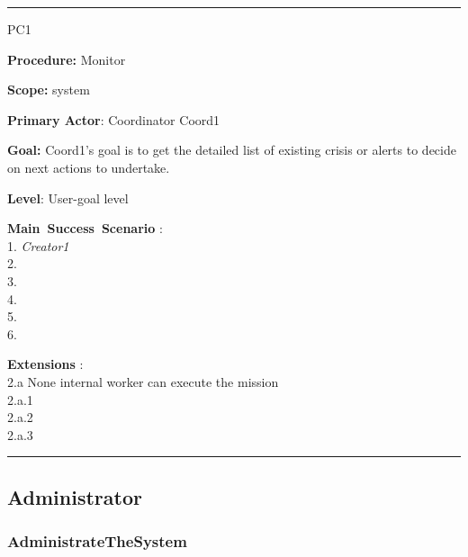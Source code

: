 \hrule
\begin{lyxlist}{PC1}
\small{
\item [\textbf{Procedure:}] Monitor
\item [\textbf{Scope:}] system
\item [\textbf{Primary Actor}:] Coordinator Coord1
\item [\textbf{Goal:}] Coord1’s goal is to get the detailed list of
existing crisis or alerts to decide on next actions to undertake.
\item [\textbf{Level}:] User-goal level
\item [\textbf{Main~Success~Scenario}]:\\
1. \emph{Creator1} \\
2. \\
3. \\
4. \\
5. \\
6.


\item [\textbf{Extensions}]:\\
2.a None internal worker can execute the mission\\
\hspace*{0.5cm} 2.a.1 \\
\hspace*{0.5cm} 2.a.2 \\
\hspace*{0.5cm} 2.a.3 \\

}

\end{lyxlist}
\hrule

\subsection{Administrator}

\subsubsection{AdministrateTheSystem}

